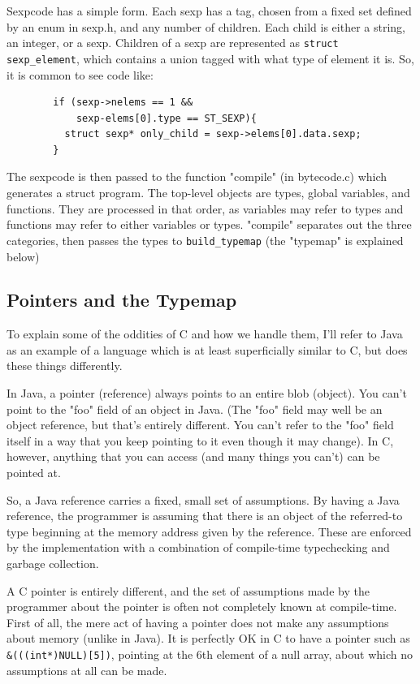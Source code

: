 \documentclass[10pt,a4paper]{report}
\begin{document}
Sexpcode has a simple form. Each sexp has a tag, chosen from a fixed set defined by an enum in sexp.h, and any number of children. Each child is either a string, an integer, or a sexp. Children of a sexp are represented as \lstinline{struct sexp_element}, which contains a union tagged with what type of element it is. So, it is common to see code like:

\begin{verbatim}
        if (sexp->nelems == 1 &&
            sexp-elems[0].type == ST_SEXP){
          struct sexp* only_child = sexp->elems[0].data.sexp;
        }
\end{verbatim}

The sexpcode is then passed to the function "compile" (in bytecode.c) which generates a struct program. The top-level objects are types, global variables, and functions. They are processed in that order, as variables may refer to types and functions may refer to either variables or types. "compile" separates out the three categories, then passes the types to \lstinline{build_typemap} (the "typemap" is explained below)


\subsection{Pointers and the Typemap}

To explain some of the oddities of C and how we handle them, I'll refer to Java as an example of a language which is at least superficially similar to C, but does these things differently.

In Java, a pointer (reference) always points to an entire blob (object). You can't point to the "foo" field of an object in Java. (The "foo" field may well be an object reference, but that's entirely different. You can't refer to the "foo" field itself in a way that you keep pointing to it even though it may change). In C, however, anything that you can access (and many things you can't) can be pointed at.

So, a Java reference carries a fixed, small set of assumptions. By having a Java reference, the programmer is assuming that there is an object of the referred-to type beginning at the memory address given by the reference. These are enforced by the implementation with a combination of compile-time typechecking and garbage collection.

A C pointer is entirely different, and the set of assumptions made by the programmer about the pointer is often not completely known at compile-time. First of all, the mere act of having a pointer does not make any assumptions about memory (unlike in Java). It is perfectly OK in C to have a pointer such as \lstinline{&(((int*)NULL)[5])}, pointing at the 6th element of a null array, about which no assumptions at all can be made.
\end{document}
